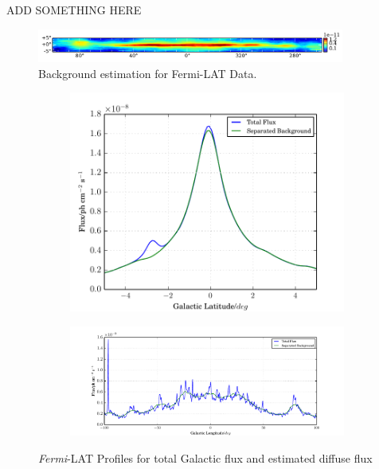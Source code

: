 \documentclass{PoS}
\begin{document}
ADD SOMETHING HERE

\begin{figure}
  \begin{center}
      \includegraphics[width=0.9\textwidth]{figures/BG_DATA.pdf}
  \caption{Background estimation for Fermi-LAT Data.}
  \end{center}
\end{figure}

\begin{figure}
\centering
\begin{subfigure}{0.3\textwidth}
      \includegraphics[width=\textwidth]{figures/GLAT.pdf}
\end{subfigure}
\begin{subfigure}{0.6\textwidth}
        \includegraphics[width=\textwidth]{figures/GLON.pdf}
\end{subfigure}
\caption{\textit{Fermi}-LAT Profiles for total Galactic flux and estimated diffuse flux}
\end{figure}
\end{document}
